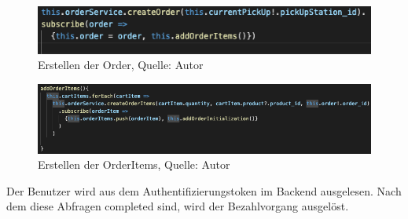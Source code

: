 \begin{figure}[H]
	\centering
	\includegraphics[scale=0.5]{images/createOrder.PNG}
	\caption[Erstellen der Order]{Erstellen der Order, Quelle: Autor}
	\label{img: createOrder}
\end{figure}
\begin{figure}[H]
	\centering
	\includegraphics[width=1\textwidth]{images/createOrderItems.PNG}
	\caption[Erstellen der OrderItems]{Erstellen der OrderItems, Quelle: Autor}
	\label{img: createOrderItems}
\end{figure}

Der Benutzer wird aus dem Authentifizierungstoken im Backend ausgelesen. 
Nach dem diese Abfragen completed sind, wird der Bezahlvorgang ausgelöst. 

